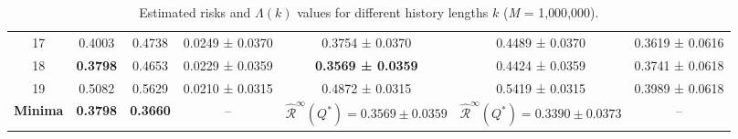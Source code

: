 \documentclass{article}
\begin{document}
\begin{table}[H]
{\begin{tabular}{c c c c c c c}
17 & 0.4003 & 0.4738 & 0.0249 ± 0.0370 & 0.3754 ± 0.0370 & 0.4489 ± 0.0370 & 0.3619 ± 0.0616 \\
18 & \textbf{0.3798} & 0.4653 & 0.0229 ± 0.0359 & \textbf{0.3569 ± 0.0359} & 0.4424 ± 0.0359 & 0.3741 ± 0.0618 \\
19 & 0.5082 & 0.5629 & 0.0210 ± 0.0315 & 0.4872 ± 0.0315 & 0.5419 ± 0.0315 & 0.3989 ± 0.0618 \\
\midrule
\multicolumn{1}{r}{\textbf{Minima}} &
\textbf{0.3798} &
\textbf{0.3660} &
-- &
$\hat{\mathcal{R}}^\infty(Q^*) = 0.3569 \pm 0.0359$ &
$\hat{\mathcal{R}}^\infty(Q^*) = 0.3390 \pm 0.0373$ &
-- \\
\bottomrule
\end{tabular}
}
\captionsetup{justification=centering}
\caption{Estimated risks and $\Lambda(k)$ values for different history lengths $k$ (\textit{M} = 1{,}000{,}000).}
\label{tab:universal_learning_3}
\end{table}
\end{document}
